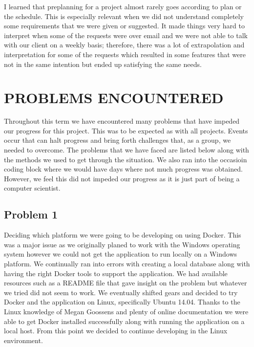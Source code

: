 \documentclass[draftclsnofoot,10pt,onecolumn]{IEEEtran} %
\begin{document}
I learned that preplanning for a project almost rarely goes according to plan or
the schedule. This is especially relevant when we did not understand completely
some requirements that we were given or suggested. It made things very hard to
interpret when some of the requests were over email and we were not able to talk
with our client on a weekly basis; therefore, there was a lot of extrapolation
and interpretation for some of the requests which resulted in some features that
were not in the same intention but ended up satisfying the same needs.


\section{PROBLEMS ENCOUNTERED}

Throughout this term we have encountered many problems that have impeded our
progress for this project. This was to be expected as with all projects.  Events
occur that can halt progress and bring forth challenges that, as a group, we
needed to overcome. The problems that we have faced are listed below along with
the methods we used to get through the situation. We also ran into the occasioin
coding block where we would have days where not much progress was obtained.
However, we feel this did not impeded our progress as it is just part of being a
computer scientist.

\subsection{Problem 1}
Deciding which platform we were going to be developing on using Docker. This was
a major issue as we originally planed to work with the Windows operating system
however we could not get the application to run locally on a Windows platform.
We continually ran into errors with creating a local database along with having
the right Docker tools to support the application. We had available resources
such as a README file that gave insight on the problem but whatever we tried did
not seem to work. We eventually shifted gears and decided to try Docker and the
application on Linux, specifically Ubuntu 14.04. Thanks to the Linux knowledge
of Megan Goossens and plenty of online documentation we were able to get Docker
installed successfully along with running the application on a local host. From
this point we decided to continue developing in the Linux environment.
\end{document}
